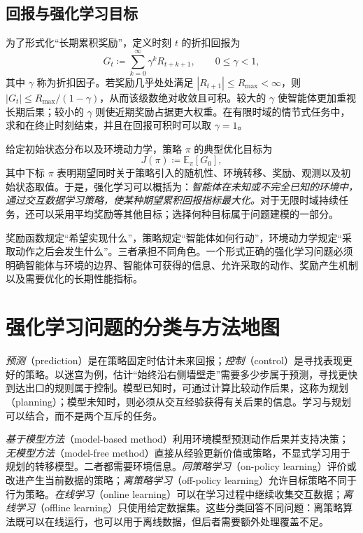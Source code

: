 \documentclass[UTF8,12pt,a4paper,fontset=fandol]{ctexbook}
\begin{document}
\subsection{回报与强化学习目标}


为了形式化“长期累积奖励”，定义时刻 $t$ 的折扣回报为
\begin{equation}
  G_t
  \coloneqq
  \sum_{k=0}^{\infty}\gamma^k R_{t+k+1},
  \qquad 0\leq \gamma<1,
  \label{eq:discounted-return}
\end{equation}
其中 $\gamma$ 称为折扣因子。若奖励几乎处处满足 $|R_{t+1}|\leq R_{\max}<\infty$，则 $|G_t|\leq R_{\max}/(1-\gamma)$，从而该级数绝对收敛且可积。较大的 $\gamma$ 使智能体更加重视长期后果；较小的 $\gamma$ 则使近期奖励占据更大权重。在有限时域的情节式任务中，求和在终止时刻结束，并且在回报可积时可以取 $\gamma=1$。


给定初始状态分布以及环境动力学，策略 $\pi$ 的典型优化目标为
\begin{equation}
  J(\pi)
  \coloneqq
  \mathbb{E}_{\pi}\!\left[G_0\right],
  \label{eq:rl-objective}
\end{equation}
其中下标 $\pi$ 表明期望同时关于策略引入的随机性、环境转移、奖励、观测以及初始状态取值。于是，强化学习可以概括为：\emph{智能体在未知或不完全已知的环境中，通过交互数据学习策略，使某种期望累积回报指标最大化。}对于无限时域持续任务，还可以采用平均奖励等其他目标；选择何种目标属于问题建模的一部分。


\begin{remark}
奖励函数规定“希望实现什么”，策略规定“智能体如何行动”，环境动力学规定“采取动作之后会发生什么”。三者承担不同角色。一个形式正确的强化学习问题必须明确智能体与环境的边界、智能体可获得的信息、允许采取的动作、奖励产生机制以及需要优化的长期性能指标。
\end{remark}


\section{强化学习问题的分类与方法地图}

\emph{预测}（prediction）是在策略固定时估计未来回报；\emph{控制}（control）是寻找表现更好的策略。以迷宫为例，估计“始终沿右侧墙壁走”需要多少步属于预测，寻找更快到达出口的规则属于控制。模型已知时，可通过计算比较动作后果，这称为规划（planning）；模型未知时，则必须从交互经验获得有关后果的信息。学习与规划可以结合，而不是两个互斥的任务。

\emph{基于模型方法}（model-based method）利用环境模型预测动作后果并支持决策；\emph{无模型方法}（model-free method）直接从经验更新价值或策略，不显式学习用于规划的转移模型。二者都需要环境信息。\emph{同策略学习}（on-policy learning）评价或改进产生当前数据的策略；\emph{离策略学习}（off-policy learning）允许目标策略不同于行为策略。\emph{在线学习}（online learning）可以在学习过程中继续收集交互数据；\emph{离线学习}（offline learning）只使用给定数据集。这些分类回答不同问题：离策略算法既可以在线运行，也可以用于离线数据，但后者需要额外处理覆盖不足。
\end{document}
